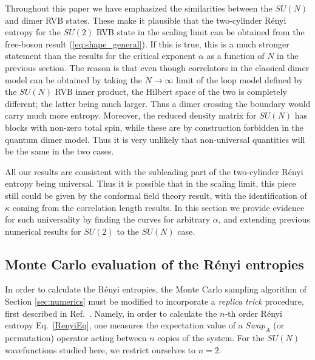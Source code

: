 \documentclass[11pt]{iopart}
\begin{document}
Throughout this paper we have emphasized the similarities between the $SU(N)$ and dimer RVB states. These make it plausible that the two-cylinder R\'enyi entropy for the $SU(2)$ RVB state in the scaling limit can be obtained from the free-boson result (\ref{eq:shape_general}). If this is true, this is a much stronger statement than the results for the critical exponent $\alpha$ as a function of $N$ in the previous section. The reason is that even though correlators in the classical dimer model can be obtained by taking the $N\to\infty$ limit of the loop model defined by the $SU(N)$ RVB inner product, the Hilbert space of the two is completely different; the latter being much larger. Thus a dimer crossing the boundary would carry much more entropy. Moreover, the reduced density matrix for $SU(N)$ has blocks with non-zero total spin, while these are by construction forbidden in the quantum dimer model. Thus it is very unlikely that non-universal quantities will be the same in the two cases. 


All our results are consistent with the subleading part of the two-cylinder R\'enyi entropy being universal. Thus it is possible that in the scaling limit, this piece still could be given by the conformal field theory result, with the identification of $\kappa$ coming from the correlation length results. In this section we provide evidence for such universality by finding the curves for arbitrary $\alpha$, and extending previous numerical results \cite{Ju2012} for $SU(2)$ to the $SU(N)$ case.

\subsection{Monte Carlo evaluation of the R\'enyi entropies}
\label{sec:su2_numerics}

In order to calculate the R\'enyi entropies, the Monte Carlo sampling algorithm of Section \ref{sec:numerics} must be modified to incorporate
a {\it replica trick} procedure, first described in Ref.~\cite{swap}.  Namely, in order to calculate the $n$-th order R\'enyi entropy Eq.~\ref{RenyiEq}, one measures the expectation value of a $Swap_A$ (or permutation) operator acting between $n$ copies of the system.  For the $SU(N)$ wavefunctions studied here, we restrict ourselves to $n=2$.  
\end{document}
